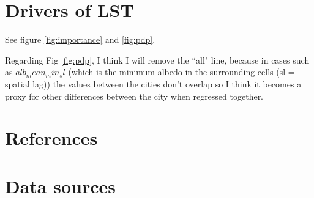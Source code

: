 \documentclass[final,3p,times,twocolumn,sort&compress]{elsarticle}
\begin{document}
\section{Drivers of LST}
See figure \ref{fig:importance} and \ref{fig:pdp}.

Regarding Fig \ref{fig:pdp}, I think I will remove the ``all" line, because in cases such as $alb_mean_min_sl$ (which is the minimum albedo in the surrounding cells (sl = spatial lag)) the values between the cities don't overlap so I think it becomes a proxy for other differences between the city when regressed together.







\section*{References}



\newpage
\onecolumn
\appendix

\section{Data sources}
\end{document}
